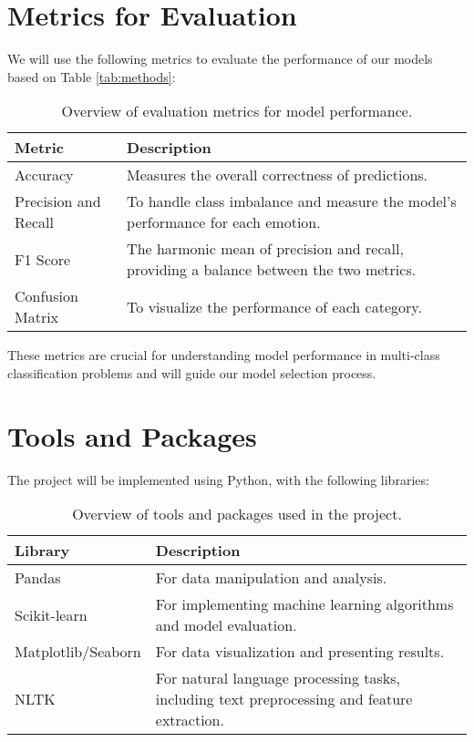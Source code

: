\documentclass[runningheads]{llncs}
\begin{document}
\newpage

\section{Metrics for Evaluation}
We will use the following metrics to evaluate the performance of our models based on Table \ref{tab:methods}:

\begin{table}[h!]
    \centering
    \begin{tabular}{|l|p{10cm}|}
        \hline
        \textbf{Metric} & \textbf{Description} \\ \hline
        Accuracy & Measures the overall correctness of predictions. \\ \hline	
        Precision and Recall & To handle class imbalance and measure the model’s performance for each emotion. \\ \hline
        F1 Score & The harmonic mean of precision and recall, providing a balance between the two metrics. \\ \hline
        Confusion Matrix &  To visualize the performance of each category. \\ \hline
        
    \end{tabular}
    \caption{Overview of evaluation metrics for model performance.}
    \label{tab:metrics}
\end{table}

These metrics are crucial for understanding model performance in multi-class classification problems 
and will guide our model selection process.

\section{Tools and Packages}
The project will be implemented using Python, with the following libraries:

\begin{table}[h!]
    \centering
    \begin{tabular}{|l|p{10cm}|}
        \hline
        \textbf{Library} & \textbf{Description} \\ \hline
        Pandas & For data manipulation and analysis. \\ \hline
        Scikit-learn & For implementing machine learning algorithms and model evaluation. \\ \hline
        Matplotlib/Seaborn & For data visualization and presenting results. \\ \hline
        NLTK & For natural language processing tasks, including text preprocessing and feature extraction. \\ \hline
    \end{tabular}
    \caption{Overview of tools and packages used in the project.}
    \label{tab:tools}
\end{table}
\end{document}
